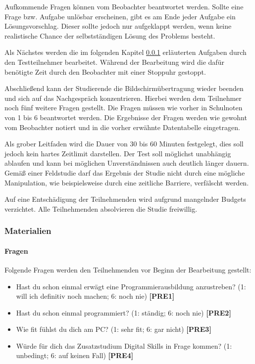 Aufkommende Fragen können vom Beobachter beantwortet werden. Sollte eine Frage
bzw. Aufgabe unlösbar erscheinen, gibt es am Ende jeder Aufgabe ein
Lösungsvorschlag. Dieser sollte jedoch nur aufgeklappt werden, wenn keine
realistische Chance der selbstständigen Lösung des Problems besteht.

Als Nächstes werden die im folgenden Kapitel \ref{studie-materialien}
erläuterten Aufgaben durch den Testteilnehmer bearbeitet. Während der
Bearbeitung wird die dafür benötigte Zeit durch den Beobachter mit einer
Stoppuhr gestoppt.

Abschließend kann der Studierende die Bildschirmübertragung wieder beenden und
sich auf das Nachgespräch konzentrieren. Hierbei werden dem Teilnehmer noch
fünf weitere Fragen gestellt. Die Fragen müssen wie vorher in Schulnoten von 1
bis 6 beantwortet werden. Die Ergebnisse der Fragen werden wie gewohnt vom
Beobachter notiert und in die vorher erwähnte Datentabelle eingetragen.

Als grober Leitfaden wird die Dauer von 30 bis 60 Minuten festgelegt, dies soll
jedoch kein hartes Zeitlimit darstellen. Der Test soll möglichst unabhängig
ablaufen und kann bei möglichen Unverständnissen auch deutlich länger dauern.
Gemäß einer Feldstudie darf das Ergebnis der Studie nicht durch eine mögliche 
Manipulation, wie beispielsweise durch eine zeitliche Barriere, verfälscht
werden.

Auf eine Entschädigung der Teilnehmenden wird aufgrund mangelnder Budgets
verzichtet. Alle Teilnehmenden absolvieren die Studie freiwillig.

\subsubsection{Materialien}\label{studie-materialien}
\paragraph{Fragen}
Folgende Fragen werden den Teilnehmenden vor Beginn der Bearbeitung gestellt:

\begin{itemize}
    \item Hast du schon einmal erwägt eine Programmierausbildung anzustreben?
    (1: will ich definitiv noch machen; 6: noch nie) \textbf{[PRE1]}
    \item Hast du schon einmal programmiert? (1: ständig; 6: noch nie)
    \textbf{[PRE2]}
    \item Wie fit fühlst du dich am PC? (1: sehr fit; 6: gar nicht)
    \textbf{[PRE3]}
    \item Würde für dich das Zusatzstudium Digital Skills in Frage kommen?
    (1: unbedingt; 6: auf keinen Fall) \textbf{[PRE4]}
\end{itemize}

